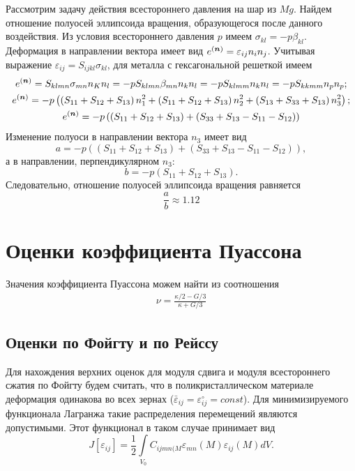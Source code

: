 \documentclass[12pt, a4paper]{article}
\renewcommand{\vec}[1]{\text{\mathversion{bold}${#1}$}}%
\begin{document}
Рассмотрим задачу действия всестороннего давления на шар из $Mg$. Найдем отношение полуосей эллипсоида вращения, образующегося после данного воздействия.
Из условия всестороннего давления $p$ имеем $\sigma_{kl} = - p \beta_{kl}$.
Деформация в направлении вектора имеет вид $e^{(\vec{n})} = \varepsilon_{ij}n_in_j$.
Учитывая выражение $\varepsilon_{ij} = S_{ijkl}\sigma_{kl}$, для металла
с гексагональной решеткой имеем
\begin{gather*}
e^{(\vec{n})} = S_{klmn} \sigma_{mn} n_K n_l = - p S_{klmn} \beta_{mn} n_k n_l = - p S_{klmm} n_k n_l = - p S_{kkmm}n_p n_p;\\
e^{(\vec{n})} = -p \left(\left(S_{11} + S_{12} + S_{13} \right)n_1^2 + \left(S_{11} + S_{12} + S_{13} \right)n_2^2 + \left(S_{13} + S_{33} + S_{13} \right)n_3^2 \right);\\
e^{(\vec{n})} = -p \left( \left( S_{11} + S_{12} + S_{13}\right) + \left( S_{33} + S_{13} - S_{11} - S_{12}\right) \right)
\end{gather*}
Изменение полуоси в направлении вектора $n_3$ имеет вид
\[
a = - p \left( \left( S_{11} + S_{12} + S_{13}\right) + \left( S_{33} + S_{13} - S_{11} - S_{12}\right) \right),
\]
а в направлении, перпендикулярном $n_3$:
\[
b = -p  \left( S_{11} + S_{12} + S_{13}\right).
\]
Следовательно, отношение полуосей эллипсоида вращения равняется
\[
\frac{a}{b} \approx 1.12
\]

\section{Оценки коэффициента Пуассона}
Значения коэффициента Пуассона можем найти из соотношения 
\begin{gather}
	\label{puasson-4}
	\nu = \frac{\kappa / 2 - G / 3}{\kappa + G / 3}
\end{gather}

\subsection{Оценки по Фойгту и по Рейссу}
Для нахождения верхних оценок для модуля сдвига и модуля всестороннего сжатия по Фойгту будем считать, что в поликристаллическом материале деформация одинакова во всех зернах ($\bar{\varepsilon}_{ij} = \varepsilon_{ij}^{\circ} = const$).
Для минимизируемого функционала Лагранжа такие распределения перемещений являются допустимыми. Этот функционал в таком случае принимает вид
\[
J[\varepsilon_{ij}] = \frac{1}{2} \int \limits_{V_0} {C_{ijmn (M} \varepsilon_{mn} (M) \varepsilon_{ij} (M) d V}.
\]
\end{document}

